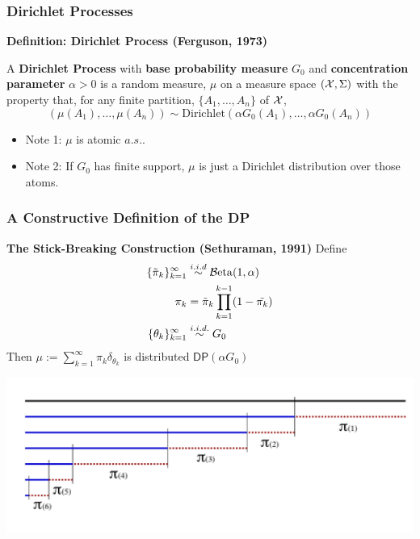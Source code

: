 \documentclass[11pt, mathserif, handout, table]{beamer}
\begin{document}
\begin{frame}
  \frametitle{Dirichlet Processes}
  \begin{exampleblock}{\small
      {\bf Definition: Dirichlet Process (Ferguson, 1973)}

\vspace{0.1in}
    A {\bf Dirichlet Process} with {\bf
      base probability measure} $G_0$ and {\bf concentration
      parameter} $\alpha > 0$ is a random measure, $\mu$ on a measure
    space $(\mathcal{X}, \Sigma)$ with the property that, for any finite
    partition, $\{A_1, \dots, A_n\}$ of $\mathcal{X}$,
    \begin{equation}
      \label{eq:6}
      (\mu(A_1), \dots, \mu(A_n)) \sim
      \mathrm{Dirichlet}(\alpha G_0(A_1), \dots, \alpha G_0(A_n))
    \end{equation}
}
  \end{exampleblock}

  \begin{itemize}
  \item Note 1: $\mu$ is atomic $a.s.$.
  \item Note 2: If $G_0$ has finite support, $\mu$ is just a
    Dirichlet distribution over those atoms.
  \end{itemize}
\end{frame}

\begin{frame}
  \frametitle{A Constructive Definition of the DP}
  \begin{exampleblock}{\small
      {\bf The Stick-Breaking Construction (Sethuraman, 1991)}
\vspace{0.1in}
    Define 
    \begin{align*}
      \{\tilde{\pi}_k\}_{k=1}^{\infty} &\stackrel{i.i.d}{\sim} \mathcal{B}\mathrm{eta}(1,\alpha)
      \\
      \pi_k &= \tilde{\pi}_k \prod_{k=1}^{k-1} (1 - \tilde{\pi_{k}}) \\
      \{\theta_k\}_{k=1}^{\infty} &\stackrel{i.i.d.}{\sim} G_0
    \end{align*}
    Then
      $\mu := \sum_{k=1}^{\infty} \pi_k \delta_{\theta_k}$
    is distributed $\mathsf{DP}(\alpha G_0)$
}
\end{exampleblock}
\vspace{-0.2in}
\begin{center}
  \includegraphics[width=1\textwidth]{img/stick-breaking.png}
\end{center}
\end{frame}
\end{document}
